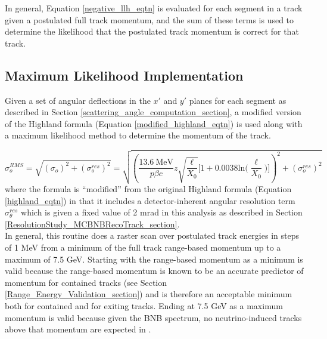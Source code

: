 In general, Equation \ref{negative_llh_eqtn} is evaluated for each segment in a track given a postulated full track momentum, and the sum of these terms is used to determine the likelihood that the postulated track momentum is correct for that track.

\subsection{Maximum Likelihood Implementation}\label{maximum_likelihood_section}

Given a set of angular deflections in the $x'$ and $y'$ planes for each segment as described in Section \ref{scattering_angle_computation_section}, a modified version of the Highland formula (Equation \ref{modified_highland_eqtn}) is used along with a maximum likelihood method to determine the momentum of the track. 

\begin{equation}\label{modified_highland_eqtn}
\sigma_{o}^{RMS} = \sqrt{ (\sigma_o)^2 + (\sigma_o^{res})^2} = \sqrt{ (\frac{13.6\  \text{MeV}}{p\beta c}z\sqrt{\frac{\ell}{X_0}}\Big[1+0.0038\text{ln}\Big(\frac{\ell}{X_0}\Big)\Big])^2 + (\sigma_o^{res})^2 }
\end{equation}
where the formula is ``modified'' from the original Highland formula (Equation \ref{highland_eqtn}) in that it includes a detector-inherent angular resolution term $\sigma_\theta^{res}$ which is given a fixed value of 2 mrad in this analysis as described in Section \ref{ResolutionStudy_MCBNBRecoTrack_section}\cite{leonidas2}.\\

In general, this routine does a raster scan over postulated track energies in steps of 1 MeV from a minimum of the full track range-based momentum up to a maximum of 7.5 GeV. Starting with the range-based momentum as a minimum is valid because the range-based momentum is known to be an accurate predictor of momentum for contained tracks (see Section \ref{Range_Energy_Validation_section}) and is therefore an acceptable minimum both for contained and for exiting tracks. Ending at 7.5 GeV as a maximum momentum is valid because given the BNB spectrum, no neutrino-induced tracks above that momentum are expected in {\ub}.\\

